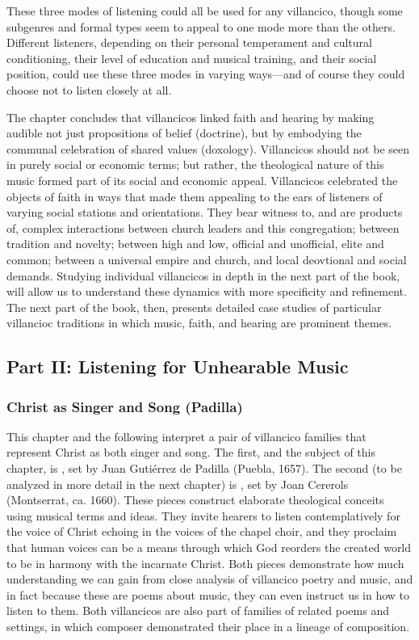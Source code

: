 \documentclass[tt]{vcbook-proposal}
\begin{document}
These three modes of listening could all be used for any villancico, though some subgenres and formal types seem to appeal to one mode more than the others.
Different listeners, depending on their personal temperament and cultural conditioning, their level of education and musical training, and their social position, could use these three modes in varying ways---and of course they could choose not to listen closely at all.

The chapter concludes that villancicos linked faith and hearing by making audible not just propositions of belief (doctrine), but by embodying the communal celebration of shared values (doxology).
Villancicos should not be seen in purely social or economic terms; but rather, the theological nature of this music formed part of its social and economic appeal.
Villancicos celebrated the objects of faith in ways that made them appealing to the ears of listeners of varying social stations and orientations.
They bear witness to, and are products of, complex interactions between church leaders and this congregation; between tradition and novelty; between high and low, official and unofficial, elite and common; between a universal empire and church, and local deovtional and social demands.
Studying individual villancicos in depth in the next part of the book, will allow us to understand these dynamics with more specificity and refinement.
The next part of the book, then, presents detailed case studies of particular villancioc traditions in which music, faith, and hearing are prominent themes.


\subsection{Part II: Listening for Unhearable Music}

\subsubsection{Christ as Singer and Song (Padilla)}

This chapter and the following interpret a pair of villancico families that represent Christ as both singer and song.
The first, and the subject of this chapter, is , set by Juan Gutiérrez de Padilla (Puebla, 1657).
The second (to be analyzed in more detail in the next chapter) is , set by Joan Cererols (Montserrat, ca. 1660).
These pieces construct elaborate theological conceits using musical terms and ideas.
They invite hearers to listen contemplatively for the voice of Christ echoing in the voices of the chapel choir, and they proclaim that human voices can be a means through which God reorders the created world to be in harmony with the incarnate Christ.
Both pieces demonstrate how much understanding we can gain from close analysis of villancico poetry and music, and in fact because these are poems about music, they can even instruct us in how to listen to them.
Both villancicos are also part of families of related poems and settings, in which composer demonstrated their place in a lineage of  composition.
\end{document}
